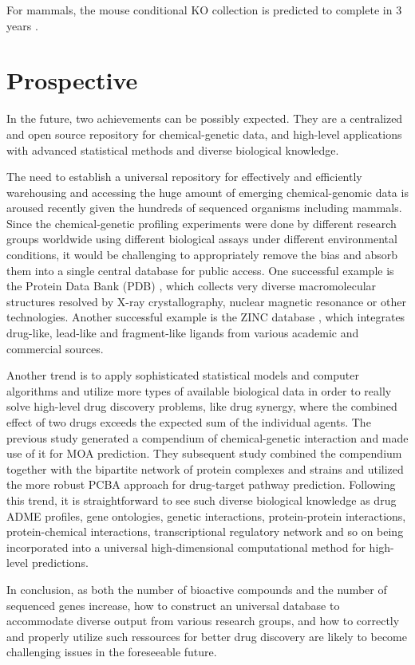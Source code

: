 \documentclass[12pt,fullpage,singlespace]{article}
\begin{document}
For mammals, the mouse conditional KO collection is predicted to complete in 3 years \citep{1082}.

\section{Prospective}

In the future, two achievements can be possibly expected. They are a centralized and open source repository for chemical-genetic data, and high-level applications with advanced statistical methods and diverse biological knowledge.

The need to establish a universal repository for effectively and efficiently warehousing and accessing the huge amount of emerging chemical-genomic data is aroused recently given the hundreds of sequenced organisms including mammals. Since the chemical-genetic profiling experiments were done by different research groups worldwide using different biological assays under different environmental conditions, it would be challenging to appropriately remove the bias and absorb them into a single central database for public access. One successful example is the Protein Data Bank (PDB) \citep{105}, which collects very diverse macromolecular structures resolved by X-ray crystallography, nuclear magnetic resonance or other technologies. Another successful example is the ZINC database \citep{532}, which integrates drug-like, lead-like and fragment-like ligands from various academic and commercial sources.

Another trend is to apply sophisticated statistical models and computer algorithms and utilize more types of available biological data in order to really solve high-level drug discovery problems, like drug synergy, where the combined effect of two drugs exceeds the expected sum of the individual agents. The previous study \citep{1078}  generated a compendium of chemical-genetic interaction and made use of it for MOA prediction. They subsequent study \citep{1079} combined the compendium together with the bipartite network of protein complexes and strains and utilized the more robust PCBA approach for drug-target pathway prediction. Following this trend, it is straightforward to see such diverse biological knowledge as drug ADME profiles, gene ontologies, genetic interactions, protein-protein interactions, protein-chemical interactions, transcriptional regulatory network and so on being incorporated into a universal high-dimensional computational method for high-level predictions.

In conclusion, as both the number of bioactive compounds and the number of sequenced genes increase, how to construct an universal database to accommodate diverse output from various research groups, and how to correctly and properly utilize such ressources for better drug discovery are likely to become challenging issues in the foreseeable future.



\end{document}
